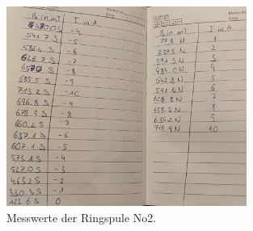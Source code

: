 \begin{figure}
    \centering
    \includegraphics[width=0.7\textwidth]{Ring2.jpeg}
    \caption{Messwerte der Ringspule No2.}
    \label{fig:M4}
\end{figure}
